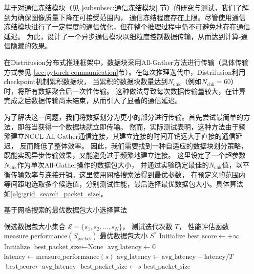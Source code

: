基于对通信冻结模块（见 \ref{subsubsec:通信冻结模块} 节）的研究与测试，我们了解到为确保图像质量下降在可接受范围内，
通信冻结程度存在上限。尽管使用通信冻结模块进行了一定程度的通信优化，但在整个推理过程中仍不可避免地存在通信延迟。
为此，设计了一个异步通信模块以细粒度控制数据传输，从而达到计算-通信隐藏的效果。
\par
在Distrifusion分布式推理框架中，数据块采用All-Gather方法进行传输（具体传输方式参见
\ref{sec:pytorch-communication}节）。在每次推理迭代中，Distrifusion利用checkpoint机制累积数据块，
当累积的数据块数量达到$N_{\text{chk}}$（例如$N_{\text{chk}}=60$）时，将所有数据聚合后一次性传输。
这种做法导致每次数据传输量较大，在计算完成之后数据传输尚未结束，从而引入了显著的通信延迟\cite{li2024distrifusion}。
\par
为了解决这一问题，我们将数据划分为更小的部分进行传输。首先尝试最简单的方法，即每当获得一个数据块就立即传输。
然而，实际测试表明，这种方法由于频繁建立NCCL All-Gather通信连接，其建立连接的时间开销远大于直接的通信延迟，
反而降低了整体效率。
因此，我们需要找到一种自适应的数据块划分策略，既能实现异步传输效果，又能避免过于频繁地建立连接。
这里设定了一个超参数$N_{\text{chk}}$作为单次All-Gather操作的数据包大小，
并通过实验确定最佳的$N_{\text{chk}}$值，以平衡传输效率与连接开销。这里使用网格搜索法得到最优参数，
在预定义的范围内等间距地选取多个候选值，分别测试性能，最后选择最优数据包大小。具体算法
如\ref{alg:grid_search_packet_size}。
\begin{algorithm}[!h]
    \caption{基于网格搜索的最优数据包大小选择算法}
    \label{alg:grid_search_packet_size}
    \renewcommand{\algorithmicrequire}{\textbf{Input:}}
    \renewcommand{\algorithmicensure}{\textbf{Output:}}
    \begin{algorithmic}[1]
        \REQUIRE 
            候选数据包大小集合 $\mathcal{S} = \{s_1, s_2, ..., s_N\}$，  
            测试迭代次数 $T$，
            性能评估函数 $\text{measure\_performance}(S_{\text{packet}})$
        \ENSURE 最优数据包大小 $S^*$
        \STATE Initialize $\text{best\_score} \leftarrow +\infty$
        \STATE Initialize $\text{best\_packet\_size} \leftarrow \text{None}$
            \STATE $\text{avg\_latency} \leftarrow 0$
                \STATE $\text{latency} \leftarrow \text{measure\_performance}(s)$
                \STATE $\text{avg\_latency} \leftarrow \text{avg\_latency} + \text{latency} / T$
            \ENDFOR
                \STATE $\text{best\_score} \leftarrow \text{avg\_latency}$
                \STATE $\text{best\_packet\_size} \leftarrow s$
            \ENDIF
        \ENDFOR
        \RETURN $\text{best\_packet\_size}$
    \end{algorithmic}
\end{algorithm}

